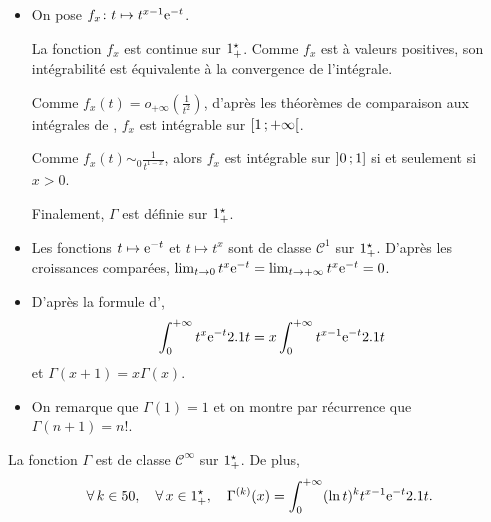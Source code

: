 \begin{demo}
\begin{itemize}
\item On pose $\fonctionligne[f_x]{t}{t^{x - 1} \e^{-t}}$.

La fonction $f_x$ est continue sur $\R_+^\star$. Comme $f_x$ est à valeurs positives, son intégrabilité est équivalente à la convergence de l'intégrale.

Comme $f_x(t) = o_{+\infty}\mathopen{}\left(\frac{1}{t^2}\right)$, d'après les théorèmes de comparaison aux intégrales de , $f_x$ est intégrable sur $\interfo{1}{+\infty}$.

Comme $f_x(t) \sim_0 \frac{1}{t^{1-x}}$, alors $f_x$ est intégrable sur $\interof{0}{1}$ si et seulement si $x > 0$.

Finalement, $\Gamma$ est définie sur $\R_+^\star$.

\item Les fonctions $t \mapsto \e^{-t}$ et $t \mapsto t^x$ sont de classe $\mathscr{C}^1$ sur $\R_+^\star$. D'après les croissances comparées, $\lim_{t\to0} t^x \e^{-t} = \lim_{t\to+\infty} t^x \e^{-t} = 0$. 
\item D'après la formule d',
\[
\int_0^{+\infty} t^x \e^{-t} \d t = x \int_0^{+\infty} t^{x-1} \e^{-t} \d t
\]
et $\Gamma(x+1) = x \Gamma(x)$.

\item On remarque que $\Gamma(1) = 1$ et on montre par récurrence que $\Gamma(n+1) = n!$.
\end{itemize}
\end{demo}



\begin{theo}[Régularité]
La fonction $\Gamma$ est de classe $\mathscr{C}^\infty$ sur $\Rpe$. De plus,
\[
\forall k \in \N,\quad \forall x \in \R_+^\star,\quad \Gamma^{(k)}(x) = \int_{0}^{+\infty} (\ln t)^k t^{x-1} \e^{-t} \d t.
\]
\end{theo}

